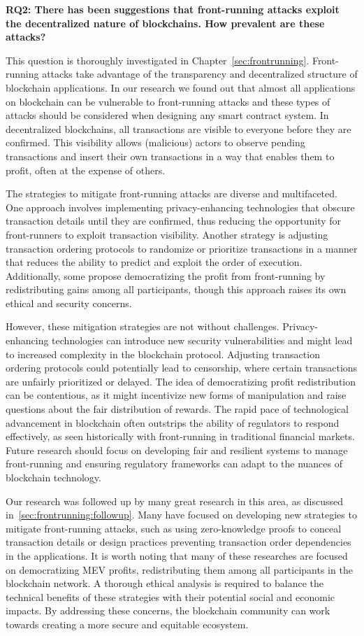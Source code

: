 \textbf{RQ2: There has been suggestions that front-running attacks exploit the decentralized nature of blockchains. How prevalent are these attacks?}

This question is thoroughly investigated in Chapter~\ref{sec:frontrunning}. Front-running attacks take advantage of the transparency and decentralized structure of blockchain applications. In our research we found out that almost all applications on blockchain can be vulnerable to front-running attacks and these types of attacks should be considered when designing any smart contract system. In decentralized blockchains, all transactions are visible to everyone before they are confirmed. This visibility allows (malicious) actors to observe pending transactions and insert their own transactions in a way that enables them to profit, often at the expense of others. 

The strategies to mitigate front-running attacks are diverse and multifaceted. One approach involves implementing privacy-enhancing technologies that obscure transaction details until they are confirmed, thus reducing the opportunity for front-runners to exploit transaction visibility. Another strategy is adjusting transaction ordering protocols to randomize or prioritize transactions in a manner that reduces the ability to predict and exploit the order of execution. Additionally, some propose democratizing the profit from front-running by redistributing gains among all participants, though this approach raises its own ethical and security concerns.

However, these mitigation strategies are not without challenges. Privacy-enhancing technologies can introduce new security vulnerabilities and might lead to increased complexity in the blockchain protocol. Adjusting transaction ordering protocols could potentially lead to censorship, where certain transactions are unfairly prioritized or delayed. The idea of democratizing profit redistribution can be contentious, as it might incentivize new forms of manipulation and raise questions about the fair distribution of rewards. The rapid pace of technological advancement in blockchain often outstrips the ability of regulators to respond effectively, as seen historically with front-running in traditional financial markets. Future research should focus on developing fair and resilient systems to manage front-running and ensuring regulatory frameworks can adapt to the nuances of blockchain technology.

Our research was followed up by many great research in this area, as discussed in~\ref{sec:frontrunning:followup}. Many have focused on developing new strategies to mitigate front-running attacks, such as using zero-knowledge proofs to conceal transaction details or design practices preventing transaction order dependencies in the applications. It is worth noting that many of these researches are focused on democratizing MEV profits, redistributing them among all participants in the blockchain network. A thorough ethical analysis is required to balance the technical benefits of these strategies with their potential social and economic impacts. By addressing these concerns, the blockchain community can work towards creating a more secure and equitable ecosystem.


